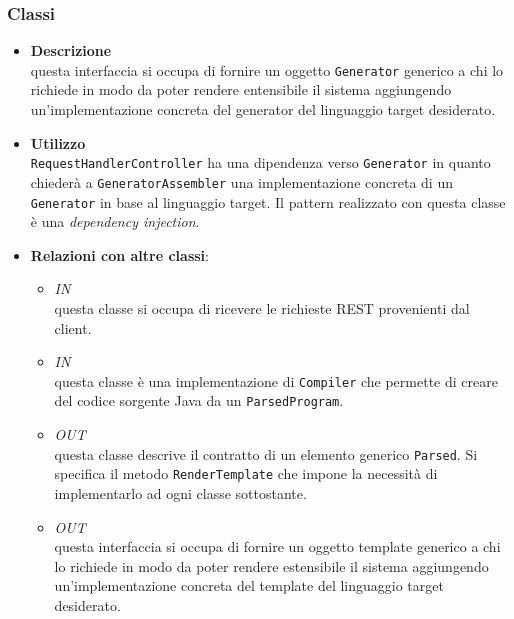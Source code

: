 \subsubsection{Classi}
\label{\nogloxy{swedesigner::server::generator::Generator}}
\begin{itemize}
\item \textbf{Descrizione}\\
questa interfaccia si occupa di fornire un oggetto \texttt{Generator} generico a chi lo richiede in modo da poter rendere entensibile il sistema aggiungendo un'implementazione concreta del generator del linguaggio target desiderato.
\item \textbf{Utilizzo}\\
\texttt{RequestHandlerController} ha una dipendenza verso \texttt{Generator} in quanto chiederà a \texttt{GeneratorAssembler} una implementazione concreta di un \texttt{Generator} in base al linguaggio target. Il pattern realizzato con questa classe è una \emph{dependency injection}.
\item \textbf{Relazioni con altre classi}:
\begin{itemize}
\item \textit{IN} \hyperref[\nogloxy{swedesigner::server::controller::RequestHandlerController}]{}\\
questa classe si occupa di ricevere le richieste REST provenienti dal client.
\item \textit{IN} \hyperref[\nogloxy{swedesigner::server::generator::java::JavaGenerator}]{}\\
questa classe è una implementazione di \texttt{Compiler} che permette di creare del codice sorgente Java da un \texttt{ParsedProgram}.
\item \textit{OUT} \hyperref[\nogloxy{swedesigner::server::project::ParsedElement}]{}\\
questa classe descrive il contratto di un elemento generico \texttt{Parsed}. Si specifica il metodo \texttt{RenderTemplate} che impone la necessità di implementarlo ad ogni classe sottostante.
\item \textit{OUT} \hyperref[\nogloxy{swedesigner::server::template::Template}]{}\\
questa interfaccia si occupa di fornire un oggetto template generico a chi lo richiede in modo da poter rendere estensibile il sistema aggiungendo un'implementazione concreta del template del linguaggio target desiderato.
\end{itemize}
\end{itemize}
